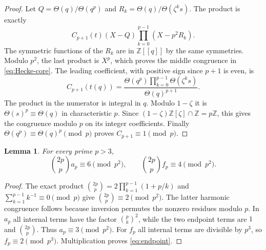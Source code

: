 \documentclass[11pt,a4paper]{article}
\newtheorem{lemma}[theorem]{Lemma}
\theoremstyle{remark}\newtheorem{remark}[theorem]{Remark}
\newcommand{\Z}{\mathbb Z}\newcommand{\Q}{\mathbb Q}
\begin{document}
\begin{proof}
Let $Q=\Theta(q)/\Theta(q^p)$ and
$R_k=\Theta(q)/\Theta(\zeta^ks)$. The product is exactly
\[
 C_{p+1}(t)(X-Q)\prod_{k=0}^{p-1}(X-p^2R_k).
\]
The symmetric functions of the $R_k$ are in $\Z[[q]]$ by the same
symmetries. Modulo $p^2$, the last product is $X^p$, which proves the
middle congruence in \eqref{eq:Hecke-core}.
The leading coefficient, with positive sign since $p+1$ is even, is
\[
 C_{p+1}(t(q))=
 \frac{\Theta(q^p)\prod_{k=0}^{p-1}\Theta(\zeta^ks)}{\Theta(q)^{p+1}}.
\]
The product in the numerator is integral in $q$.
Modulo $1-\zeta$ it is $\Theta(s)^p\equiv\Theta(q)$ in characteristic
$p$. Since $(1-\zeta)\Z[\zeta]\cap\Z=p\Z$, this gives the congruence
modulo $p$ on its integer coefficients. Finally
$\Theta(q^p)\equiv\Theta(q)^p\pmod p$ proves
$C_{p+1}\equiv1\pmod p$.
\end{proof}

\begin{lemma}\label{lem:endpoint}
For every prime $p>3$,
\begin{equation}\label{eq:endpoint}
 \binom{2p}p a_p\equiv6\pmod{p^2},\qquad
 \binom{2p}p f_p\equiv4\pmod{p^2}.
\end{equation}
\end{lemma}
\begin{proof}
The exact product
$\binom{2p}p=2\prod_{k=1}^{p-1}(1+p/k)$ and
$\sum_{k=1}^{p-1}k^{-1}\equiv0\pmod p$ give
$\binom{2p}p\equiv2\pmod{p^2}$.
The latter harmonic congruence follows because inversion permutes
the nonzero residues modulo $p$. In $a_p$ all internal terms have the
factor $\binom pk^2$, while the two endpoint terms are
$1$ and $\binom{2p}p$. Thus $a_p\equiv3\pmod{p^2}$.
For $f_p$ all internal terms are divisible by $p^3$, so
$f_p\equiv2\pmod{p^3}$. Multiplication proves \eqref{eq:endpoint}.
\end{proof}
\end{document}
